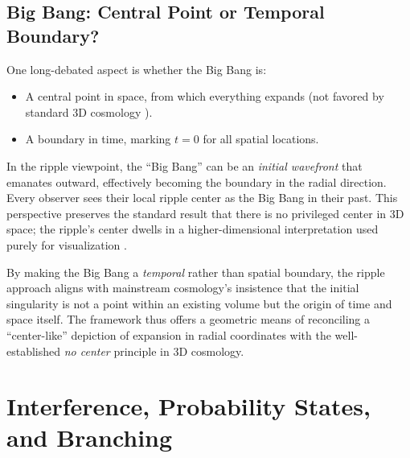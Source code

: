 \documentclass{article}
\begin{document}
\subsection{Big Bang: Central Point or Temporal Boundary?}
\label{subsec:bigbang-center}
One long-debated aspect is whether the Big Bang is:
\begin{itemize}
  \item A central point in space, from which everything expands 
        (not favored by standard 3D cosmology \cite{misner1973, rindler1977essential}).
  \item A boundary in time, marking \(t=0\) for all spatial locations.
\end{itemize}
In the ripple viewpoint, the ``Big Bang'' can be an \emph{initial wavefront} 
that emanates outward, effectively becoming the boundary in the radial 
direction. Every observer sees their local ripple center as the Big Bang 
in their past. This perspective preserves the standard result that there 
is no privileged center in 3D space; the ripple's center dwells in a 
higher-dimensional interpretation used purely for visualization \cite{penrose2004}.

By making the Big Bang a \textit{temporal} rather than spatial boundary, 
the ripple approach aligns with mainstream cosmology’s insistence that 
the initial singularity is not a point within an existing volume but the 
origin of time and space itself. The framework thus offers a geometric 
means of reconciling a “center-like” depiction of expansion in radial 
coordinates with the well-established \emph{no center} principle in 
3D cosmology.

\section{Interference, Probability States, and Branching}
\label{sec:interference-branching}
\end{document}
